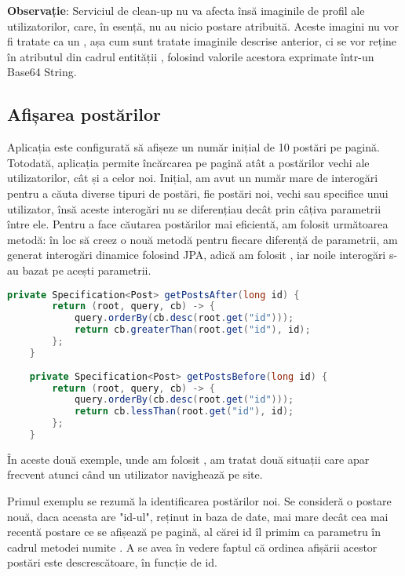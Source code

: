 \textbf{Observație}: Serviciul de clean-up nu va afecta însă imaginile de profil ale utilizatorilor, care, în esență, nu au nicio postare atribuită. Aceste imagini nu vor fi tratate ca un , așa cum sunt tratate imaginile descrise anterior, ci se vor reține în atributul  din cadrul entității , folosind valorile acestora exprimate într-un Base64 String.\newline

\subsection{Afișarea postărilor}

Aplicația este configurată să afișeze un număr inițial de 10 postări pe pagină. Totodată, aplicația permite încărcarea pe pagină atât a postărilor vechi ale utilizatorilor, cât și a celor noi. Inițial, am avut un număr mare de interogări pentru a căuta diverse tipuri de postări, fie postări noi, vechi sau specifice unui utilizator, însă aceste interogări nu se diferențiau decât prin câțiva parametrii între ele. Pentru a face căutarea postărilor mai eficientă, am folosit următoarea metodă: în loc să creez o nouă metodă pentru fiecare diferență de parametrii, am generat interogări dinamice folosind JPA\cite{.springjpa}, adică am folosit , iar noile interogări s-au bazat pe acești parametrii.\newline

\begin{lstlisting}[language=Java]
	    private Specification<Post> getPostsAfter(long id) {
		return (root, query, cb) -> {
			query.orderBy(cb.desc(root.get("id")));
			return cb.greaterThan(root.get("id"), id);
		};
	}
	
	private Specification<Post> getPostsBefore(long id) {
		return (root, query, cb) -> {
			query.orderBy(cb.desc(root.get("id")));
			return cb.lessThan(root.get("id"), id);
		};
	}
\end{lstlisting}
\bigskip

În aceste două exemple, unde am folosit , am tratat două situații care apar frecvent atunci când un utilizator navighează pe site.\newline 

Primul exemplu se rezumă la identificarea postărilor noi. Se consideră o postare nouă, daca aceasta are "id-ul", reținut in baza de date, mai mare decât cea mai recentă postare ce se afișează pe pagină, al cărei id îl primim ca parametru în cadrul metodei numite . A se avea în vedere faptul că ordinea afișării acestor postări este descrescătoare, în funcție de id.\newline

